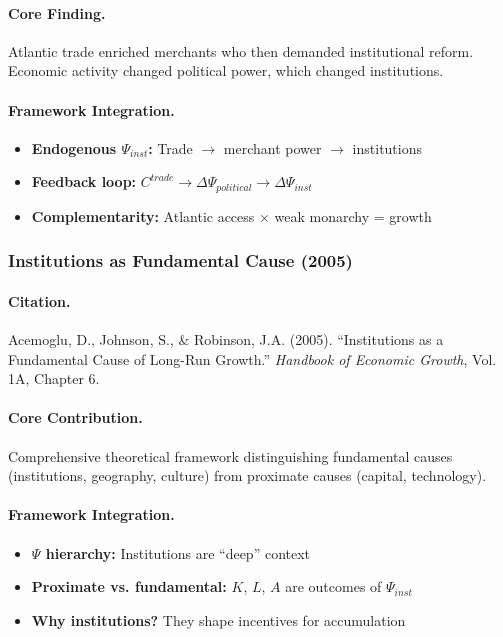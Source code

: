 \paragraph{Core Finding.}
Atlantic trade enriched merchants who then demanded institutional reform.
Economic activity changed political power, which changed institutions.

\paragraph{Framework Integration.}
\begin{itemize}
  \item \textbf{Endogenous $\Psi_{inst}$:} Trade $\to$ merchant power $\to$ institutions
  \item \textbf{Feedback loop:} $C^{trade} \to \Delta\Psi_{political} \to \Delta\Psi_{inst}$
  \item \textbf{Complementarity:} Atlantic access $\times$ weak monarchy = growth
\end{itemize}

\subsubsection{Institutions as Fundamental Cause (2005)}

\paragraph{Citation.}
Acemoglu, D., Johnson, S., \& Robinson, J.A. (2005).
``Institutions as a Fundamental Cause of Long-Run Growth.''
\emph{Handbook of Economic Growth}, Vol. 1A, Chapter 6.

\paragraph{Core Contribution.}
Comprehensive theoretical framework distinguishing fundamental causes
(institutions, geography, culture) from proximate causes (capital, technology).

\paragraph{Framework Integration.}
\begin{itemize}
  \item \textbf{$\Psi$ hierarchy:} Institutions are ``deep'' context
  \item \textbf{Proximate vs. fundamental:} $K$, $L$, $A$ are outcomes of $\Psi_{inst}$
  \item \textbf{Why institutions?} They shape incentives for accumulation
\end{itemize}

